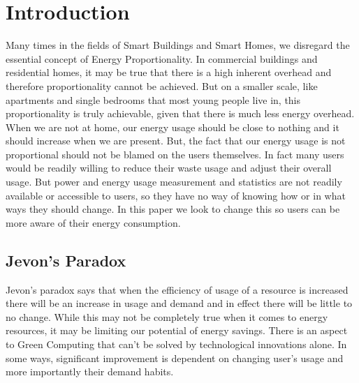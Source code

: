 \documentclass{sig-alternate-05-2015}
\begin{document}
%
%



%
%

%
%
\printccsdesc



\section{Introduction}
Many times in the fields of Smart Buildings and Smart Homes, we disregard the essential concept of Energy Proportionality. In commercial buildings and residential homes, it may be true that there is a high inherent overhead and therefore proportionality cannot be achieved. But on a smaller scale, like apartments and single bedrooms that most young people live in, this proportionality is truly achievable, given that there is much less energy overhead. When we are not at home, our energy usage should be close to nothing and it should increase when we are present. But, the fact that our energy usage is not proportional should not be blamed on the users themselves. In fact many users would be readily willing to reduce their waste usage and adjust their overall usage. But power and energy usage measurement and statistics are not readily available or accessible to users, so they have no way of knowing how or in what ways they should change. In this paper we look to change this so users can be more aware of their energy consumption.

\subsection{Jevon's Paradox}
Jevon’s paradox says that when the efficiency of usage of a resource is increased there will be an increase in usage and demand and in effect there will be little to no change. While this may not be completely true when it comes to energy resources, it may be limiting our potential of energy savings. There is an aspect to Green Computing that can’t be solved by technological innovations alone. In some ways, significant improvement is dependent on changing user's usage and more importantly their demand habits. 
\end{document}
